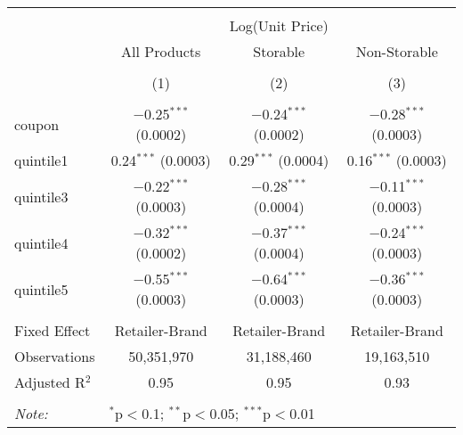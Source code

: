 
\begin{table}[!htbp] \centering 
  \caption{} 
  \label{tab:overallSavings} 
\begin{tabular}{@{\extracolsep{5pt}}lccc} 
\\[-1.8ex]\hline 
\hline \\[-1.8ex] 
 & \multicolumn{3}{c}{Log(Unit Price)} \\ 
\cline{2-4} 
 & All Products & Storable & Non-Storable \\ 
\\[-1.8ex] & (1) & (2) & (3)\\ 
\hline \\[-1.8ex] 
 coupon & $-$0.25$^{***}$ (0.0002) & $-$0.24$^{***}$ (0.0002) & $-$0.28$^{***}$ (0.0003) \\ 
  quintile1 & 0.24$^{***}$ (0.0003) & 0.29$^{***}$ (0.0004) & 0.16$^{***}$ (0.0003) \\ 
  quintile3 & $-$0.22$^{***}$ (0.0003) & $-$0.28$^{***}$ (0.0004) & $-$0.11$^{***}$ (0.0003) \\ 
  quintile4 & $-$0.32$^{***}$ (0.0002) & $-$0.37$^{***}$ (0.0004) & $-$0.24$^{***}$ (0.0003) \\ 
  quintile5 & $-$0.55$^{***}$ (0.0003) & $-$0.64$^{***}$ (0.0003) & $-$0.36$^{***}$ (0.0003) \\ 
 \hline \\[-1.8ex] 
Fixed Effect & Retailer-Brand & Retailer-Brand & Retailer-Brand \\ 
Observations & 50,351,970 & 31,188,460 & 19,163,510 \\ 
Adjusted R$^{2}$ & 0.95 & 0.95 & 0.93 \\ 
\hline 
\hline \\[-1.8ex] 
\textit{Note:}  & \multicolumn{3}{l}{$^{*}$p$<$0.1; $^{**}$p$<$0.05; $^{***}$p$<$0.01} \\ 
\end{tabular} 
\end{table} 
